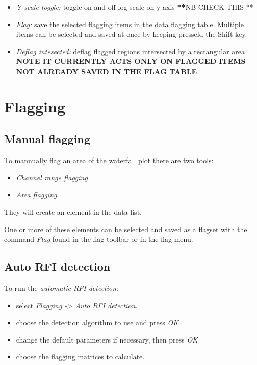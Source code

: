 \documentclass[letterpaper,10pt,english]{sphinxmanual}
\begin{document}
\begin{itemize}
\item {} 
\emph{Y scale toggle:} toggle on and off log scale on y axis {\color{red}\bfseries{}**}NB CHECK THIS **

\item {} 
\emph{Flag:} save the selected flagging items in the data flagging table. Multiple items can be
selected and saved at once by keeping presseld the Shift key.

\item {} 
\emph{Deflag intesected:} deflag flagged regions intersected by a rectangular area \textbf{NOTE IT
CURRENTLY ACTS ONLY ON FLAGGED ITEMS NOT ALREADY SAVED IN THE FLAG TABLE}

\end{itemize}


\chapter{Flagging}
\label{flagging:flagging}\label{flagging::doc}

\section{Manual flagging}
\label{flagging:manual-flagging}
To mannually flag an area of the waterfall plot there are two tools:
\begin{itemize}
\item {} 
\emph{Channel range flagging}

\item {} 
\emph{Area flagging}

\end{itemize}

They will create an element in the data list.

One or more of these elements can be selected and saved as a flagset with the command \emph{Flag} found in the flag toolbar or in the flag menu.


\section{Auto RFI detection}
\label{flagging:auto-rfi-detection}
To run the \emph{automatic RFI detection}:
\begin{itemize}
\item {} 
select \emph{Flagging -\textgreater{} Auto RFI detection}.

\item {} 
choose the detection algorithm to use and press \emph{OK}

\item {} 
change the default parameters if necessary, then press \emph{OK}

\item {} 
choose the flagging matrices to calculate.

\end{itemize}
\end{document}
